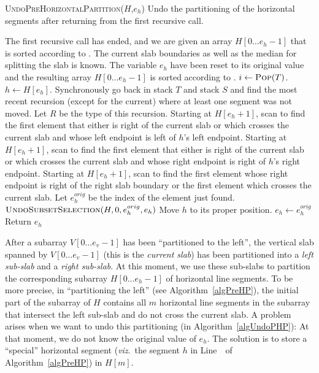 \begin{algorithm}

  \caption{\textsc{UndoPreHorizontalPartition}(${H}$,$e_h$)
  Undo the partitioning of the horizontal segments after returning from
  the first recursive call.} 
    \label{algUndoPHP}
    
  \begin{algorithmic}[1]
    \REQUIRE The first recursive call has ended, and we are
    given an array ${H}[0\ldots e_h-1]$ that is
    sorted  according to \LY. The current slab boundaries as well as
    the median for splitting the slab is known.
    \ENSURE The variable $e_h$ have been reset to its original value and
    the resulting array ${H}[0\ldots e_h-1]$ is sorted 
    according to \LY. 
    \STATE $i \leftarrow \textsc{Pop}(T)$.
      \STATE {}
    \ELSE
      \STATE $h \leftarrow {H}[e_h]$.
        \STATE Synchronously go back in stack $T$ and stack $S$ and find
        the most recent recursion (except for the current) where at
        least one segment was not moved. Let $R$ be the type of this
        recursion. 
          \STATE Starting at ${H}[e_h+1]$, scan to find the first
          element that either is right of the current slab or which
          crosses the current slab and whose left endpoint is left of
          $h$'s left endpoint.  
        \ELSE
          \STATE Starting at ${H}[e_h+1]$, scan to find the first
          element that either is right of the current slab or which
          crosses the current slab and whose right endpoint is right of
          $h$'s right endpoint. 
        \ENDIF
      \ELSE
        \STATE Starting at ${H}[e_h+1]$, scan to find the
        first element whose right endpoint is right of the right slab
        boundary or the first element which crosses the current slab.
      \ENDIF
      \STATE Let $e_h^{orig}$ be the index of the element just found.
      \STATE $\textsc{UndoSubsetSelection}({H},0,e_h^{orig},e_h)$
      \STATE Move $h$ to its proper position.
      \STATE $e_h \leftarrow e_h^{orig}$
      \STATE Return $e_h$
    \ENDIF
 \end{algorithmic}
\end{algorithm}

After a subarray ${V}[0\ldots e_v-1]$ has been ``partitioned
to the left'', the vertical slab spanned by
${V}[0\ldots e_v-1]$ (this is the \emph{current slab})
has been partitioned into a \emph{left sub-slab} and a
\emph{right sub-slab}. At this moment, we use these sub-slabs to
partition the corresponding subarray ${H}[0\ldots e_h-1]$
of horizontal line segments. To be more precise, in ``partitioning the 
left'' (see Algorithm~\ref{algPreHP}), the initial part 
of the subarray of ${H}$ contains all $m$ horizontal line segments
in the subarray that intersect the left sub-slab and do not cross the
current slab. A problem arises when we want to undo this partitioning
(in Algorithm~\ref{algUndoPHP}): At that moment, we do not know the 
original value of $e_h$. The solution is to store a ``special'' horizontal 
segment (\emph{viz}.\ the segment $h$ in Line~\theStopElement\ 
of Algorithm~\ref{algPreHP}) in ${H}[m]$.

